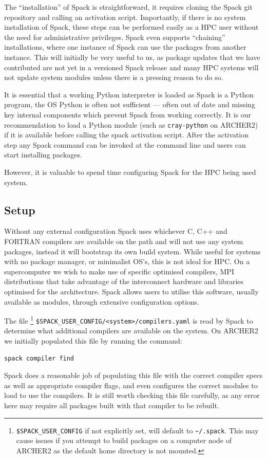 \documentclass[a4paper,11pt]{article}
\begin{document}
The ``installation'' of Spack is straightforward, it requires cloning the Spack git repository and calling an activation script.
Importantly, if there is no system installation of Spack, these steps can be performed easily as a HPC user without the need for administrative privileges.
Spack even supports ``chaining'' installations, where one instance of Spack can use the packages from another instance.
This will initially be very useful to us, as package updates that we have contributed are not yet in a versioned Spack release and many HPC systems will not update system modules unless there is a pressing reason to do so.

It is essential that a working Python interpreter is loaded as Spack is a Python program, the OS Python is often not sufficient --- often out of date and missing key internal components which prevent Spack from working correctly.
It is our recommendation to load a Python module (such as \verb`cray-python` on ARCHER2) if it is available before calling the spack activation script.
After the activation step any Spack command can be invoked at the command line and users can start installing packages.

However, it is valuable to spend time configuring Spack for the HPC being used system.

\subsection{Setup}
\label{ssec:setup}
Without any external configuration Spack uses whichever C, C++ and FORTRAN compilers are available on the path and will not use any system packages, instead it will bootstrap its own build system.
While useful for systems with no package manager, or minimalist OS's, this is not ideal for HPC.
On a supercomputer we wish to make use of specific optimised compilers, MPI distributions that take advantage of the interconnect hardware and libraries optimised for the architecture.
Spack allows users to utilise this software, usually available as modules, through extensive configuration options.

The file
\footnote{\texttt{\$SPACK\_USER\_CONFIG} if not explicitly set, will default to \texttt{\~{}/.spack}. This may cause issues if you attempt to build packages on a computer node of ARCHER2 as the default home directory is not mounted.}
\verb`$SPACK_USER_CONFIG/<system>/compilers.yaml` is read by Spack to determine what additional compilers are available on the system.
On ARCHER2 we initially populated this file by running the command:
\begin{lstlisting}[numbers=none]
spack compiler find	
\end{lstlisting}
Spack does a reasonable job of populating this file with the correct compiler specs as well as appropriate compiler flags, and even configures the correct modules to load to use the compilers.
It is still worth checking this file carefully, as any error here may require all packages built with that compiler to be rebuilt.
\end{document}
